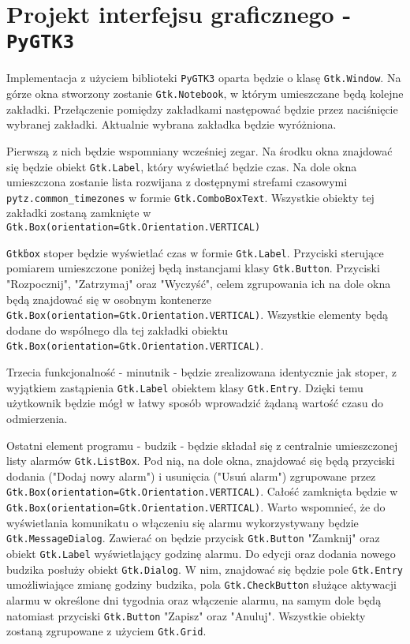 \documentclass[11pt]{article}
\begin{document}
    \section{Projekt interfejsu graficznego - \texttt{PyGTK3}}
    Implementacja z użyciem biblioteki \texttt{PyGTK3} oparta będzie o klasę \texttt{Gtk.Window}.
    Na górze okna stworzony zostanie \texttt{Gtk.Notebook}, w którym umieszczane będą kolejne zakładki.
    Przełączenie pomiędzy zakładkami następować będzie przez naciśnięcie wybranej zakładki. Aktualnie wybrana
    zakładka będzie wyróżniona.

    Pierwszą z nich będzie wspomniany wcześniej zegar. Na środku okna znajdować się będzie obiekt \texttt{Gtk.Label},
    który wyświetlać będzie czas. Na dole okna umieszczona zostanie lista rozwijana z dostępnymi strefami czasowymi 
    \texttt{pytz.common\_timezones} w formie \texttt{Gtk.ComboBoxText}. Wszystkie obiekty tej zakładki zostaną zamknięte
    w \texttt{Gtk.Box(orientation=Gtk.Orientation.VERTICAL)}

    \texttt{Gtk\.box} stoper będzie wyświetlać czas w formie \texttt{Gtk.Label}. Przyciski sterujące
    pomiarem umieszczone poniżej będą instancjami klasy \texttt{Gtk.Button}. Przyciski "Rozpocznij", "Zatrzymaj" oraz "Wyczyść",
    celem zgrupowania ich na dole okna będą znajdować się w osobnym kontenerze
    \texttt{Gtk.Box(orientation=Gtk.Orientation.VERTICAL)}. Wszystkie
    elementy będą dodane do wspólnego dla tej zakładki obiektu
    \texttt{Gtk.Box(orientation=Gtk.Orientation.VERTICAL)}.

    Trzecia funkcjonalność - minutnik - będzie zrealizowana identycznie jak stoper, z wyjątkiem
    zastąpienia \texttt{Gtk.Label} obiektem klasy \texttt{Gtk.Entry}. Dzięki temu użytkownik będzie mógł
    w łatwy sposób wprowadzić żądaną wartość czasu do odmierzenia.

    Ostatni element programu - budzik - będzie składał się z centralnie umieszczonej listy alarmów
    \texttt{Gtk.ListBox}. Pod nią, na dole okna, znajdować się będą przyciski dodania ("Dodaj nowy alarm") i usunięcia ("Usuń alarm") zgrupowane przez
    \texttt{Gtk.Box(orientation=Gtk.Orientation.VERTICAL)}. Całość zamknięta będzie w
    \texttt{Gtk.Box(orientation=Gtk.Orientation.VERTICAL)}. Warto wspomnieć, że do wyświetlania komunikatu o włączeniu się alarmu wykorzystywany będzie
    \texttt{Gtk.MessageDialog}. Zawierać on będzie przycisk \texttt{Gtk.Button} "Zamknij" oraz obiekt \texttt{Gtk.Label} wyświetlający godzinę alarmu.
    Do edycji oraz dodania nowego budzika posłuży obiekt \texttt{Gtk.Dialog}. W nim, znajdować się będzie pole \texttt{Gtk.Entry} umożliwiające zmianę godziny budzika,
    pola \texttt{Gtk.CheckButton} służące aktywacji alarmu w określone dni tygodnia oraz włączenie alarmu, na samym dole będą natomiast przyciski \texttt{Gtk.Button} "Zapisz"
    oraz "Anuluj". Wszystkie obiekty zostaną zgrupowane z użyciem \texttt{Gtk.Grid}.
\end{document}
